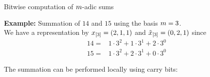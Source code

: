 \documentclass{beamer}
\begin{document}
    \begin{frame}{Bitwise computation of $m$-adic sums}

        {\bf Example:} Summation of $14$ and $15$ using the basis $m=3$. \\
        We have a representation by $x_{[3]}=(2,1,1)$ and  $\tilde{x}_{[3]}=(0,2,1)$ since
        \begin{align*}
            14 = & 1 \cdot 3^2 + 1 \cdot 3^1 + 2 \cdot 3^0 \\
            15 = & 1 \cdot 3^2 + 2 \cdot 3^1 + 0 \cdot 3^0
        \end{align*}

        The summation can be performed locally using carry bits:

    \end{frame}
\end{document}
